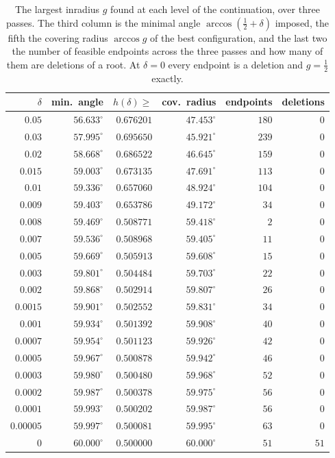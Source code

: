 \documentclass[11pt,reqno]{amsart}
\renewcommand{\_}{\origunderscore\allowbreak}
\numberwithin{equation}{section}
\theoremstyle{plain}
\theoremstyle{definition}
\theoremstyle{remark}
\begin{document}
\begin{table}[t]
\centering
\caption{The largest inradius $g$ found at each level of the
continuation, over three passes. The third column is the minimal angle
$\arccos(\tfrac12+\delta)$ imposed, the fifth the covering radius
$\arccos g$ of the best configuration, and the last two the number of
feasible endpoints across the three passes and how many of them are
deletions of a root. At $\delta=0$ every endpoint is a deletion and
$g=\tfrac12$ exactly.}
\label{tab:slack-continuation}
\small
\begin{tabular}{@{}rrrrrr@{}}
\toprule
$\delta$ & min.\ angle & $h(\delta)\ge$ & cov.\ radius & endpoints & deletions\\
\midrule
$0.05$ & $56.633^\circ$ & $0.676201$ & $47.453^\circ$ & $180$ & $0$\\
$0.03$ & $57.995^\circ$ & $0.695650$ & $45.921^\circ$ & $239$ & $0$\\
$0.02$ & $58.668^\circ$ & $0.686522$ & $46.645^\circ$ & $159$ & $0$\\
$0.015$ & $59.003^\circ$ & $0.673135$ & $47.691^\circ$ & $113$ & $0$\\
$0.01$ & $59.336^\circ$ & $0.657060$ & $48.924^\circ$ & $104$ & $0$\\
$0.009$ & $59.403^\circ$ & $0.653786$ & $49.172^\circ$ & $34$ & $0$\\
$0.008$ & $59.469^\circ$ & $0.508771$ & $59.418^\circ$ & $2$ & $0$\\
$0.007$ & $59.536^\circ$ & $0.508968$ & $59.405^\circ$ & $11$ & $0$\\
$0.005$ & $59.669^\circ$ & $0.505913$ & $59.608^\circ$ & $15$ & $0$\\
$0.003$ & $59.801^\circ$ & $0.504484$ & $59.703^\circ$ & $22$ & $0$\\
$0.002$ & $59.868^\circ$ & $0.502914$ & $59.807^\circ$ & $26$ & $0$\\
$0.0015$ & $59.901^\circ$ & $0.502552$ & $59.831^\circ$ & $34$ & $0$\\
$0.001$ & $59.934^\circ$ & $0.501392$ & $59.908^\circ$ & $40$ & $0$\\
$0.0007$ & $59.954^\circ$ & $0.501123$ & $59.926^\circ$ & $42$ & $0$\\
$0.0005$ & $59.967^\circ$ & $0.500878$ & $59.942^\circ$ & $46$ & $0$\\
$0.0003$ & $59.980^\circ$ & $0.500480$ & $59.968^\circ$ & $52$ & $0$\\
$0.0002$ & $59.987^\circ$ & $0.500378$ & $59.975^\circ$ & $56$ & $0$\\
$0.0001$ & $59.993^\circ$ & $0.500202$ & $59.987^\circ$ & $56$ & $0$\\
$0.00005$ & $59.997^\circ$ & $0.500081$ & $59.995^\circ$ & $63$ & $0$\\
$0$ & $60.000^\circ$ & $0.500000$ & $60.000^\circ$ & $51$ & $51$\\
\bottomrule
\end{tabular}
\end{table}
\end{document}
